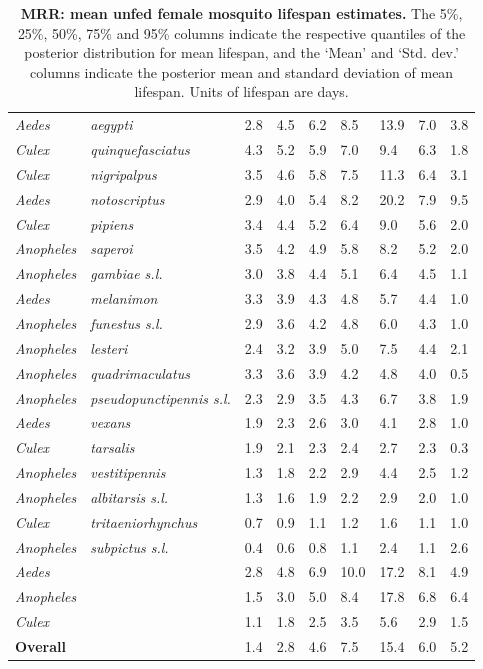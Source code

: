 \documentclass[12pt]{article}
\begin{document}
\begin{table}[htbp]
\begin{tabular}{l|l|l|l|l|l|l|l|l}
		\textit{Aedes} & \textit{aegypti} & 2.8 & 4.5 & 6.2 & 8.5 & 13.9 & 7.0 & 3.8 \\
		\textit{Culex} & \textit{quinquefasciatus} & 4.3 & 5.2 & 5.9 & 7.0 & 9.4 & 6.3 & 1.8 \\
		\textit{Culex} & \textit{nigripalpus} & 3.5 & 4.6 & 5.8 & 7.5 & 11.3 & 6.4 & 3.1 \\
		\textit{Aedes} & \textit{notoscriptus} & 2.9 & 4.0 & 5.4 & 8.2 & 20.2 & 7.9 & 9.5 \\
		\textit{Culex} & \textit{pipiens} & 3.4 & 4.4 & 5.2 & 6.4 & 9.0 & 5.6 & 2.0 \\
		\textit{Anopheles} & \textit{saperoi} & 3.5 & 4.2 & 4.9 & 5.8 & 8.2 & 5.2 & 2.0 \\
		\textit{Anopheles} & \textit{gambiae s.l.} & 3.0 & 3.8 & 4.4 & 5.1 & 6.4 & 4.5 & 1.1 \\
		\textit{Aedes} & \textit{melanimon} & 3.3 & 3.9 & 4.3 & 4.8 & 5.7 & 4.4 & 1.0 \\
		\textit{Anopheles} & \textit{funestus s.l.} & 2.9 & 3.6 & 4.2 & 4.8 & 6.0 & 4.3 & 1.0 \\
		\textit{Anopheles} & \textit{lesteri} & 2.4 & 3.2 & 3.9 & 5.0 & 7.5 & 4.4 & 2.1 \\
		\textit{Anopheles} & \textit{quadrimaculatus} & 3.3 & 3.6 & 3.9 & 4.2 & 4.8 & 4.0 & 0.5 \\
		\textit{Anopheles} & \textit{pseudopunctipennis s.l.} & 2.3 & 2.9 & 3.5 & 4.3 & 6.7 & 3.8 & 1.9 \\
		\textit{Aedes} & \textit{vexans} & 1.9 & 2.3 & 2.6 & 3.0 & 4.1 & 2.8 & 1.0 \\
		\textit{Culex} & \textit{tarsalis} & 1.9 & 2.1 & 2.3 & 2.4 & 2.7 & 2.3 & 0.3 \\
		\textit{Anopheles} & \textit{vestitipennis} & 1.3 & 1.8 & 2.2 & 2.9 & 4.4 & 2.5 & 1.2 \\
		\textit{Anopheles} & \textit{albitarsis s.l.} & 1.3 & 1.6 & 1.9 & 2.2 & 2.9 & 2.0 & 1.0 \\
		\textit{Culex} & \textit{tritaeniorhynchus} & 0.7 & 0.9 & 1.1 & 1.2 & 1.6 & 1.1 & 1.0 \\
		\textit{Anopheles} & \textit{subpictus s.l.} & 0.4 & 0.6 & 0.8 & 1.1 & 2.4 & 1.1 & 2.6 \\
		\hline
		\textit{Aedes} & \text{} & 2.8 & 4.8 & 6.9 & 10.0 & 17.2 & 8.1 & 4.9 \\
		\textit{Anopheles} & \text{} & 1.5 & 3.0 & 5.0 & 8.4 & 17.8 & 6.8 & 6.4 \\
		\textit{Culex} & \text{} & 1.1 & 1.8 & 2.5 & 3.5 & 5.6 & 2.9 & 1.5 \\
		\hline
		\textbf{Overall} & \text{} & 1.4 & 2.8 & 4.6 & 7.5 & 15.4 & 6.0 & 5.2 \\
	\end{tabular}
	\caption{\textbf{MRR: mean unfed female mosquito lifespan estimates.} The 5\%, 25\%, 50\%, 75\% and 95\% columns indicate the respective quantiles of the posterior distribution for mean lifespan, and the `Mean' and `Std. dev.' columns indicate the posterior mean and standard deviation of mean lifespan. Units of lifespan are days.}
	\label{tab:mrr_estimated_lifespans}%
\end{table}%
\end{document}

